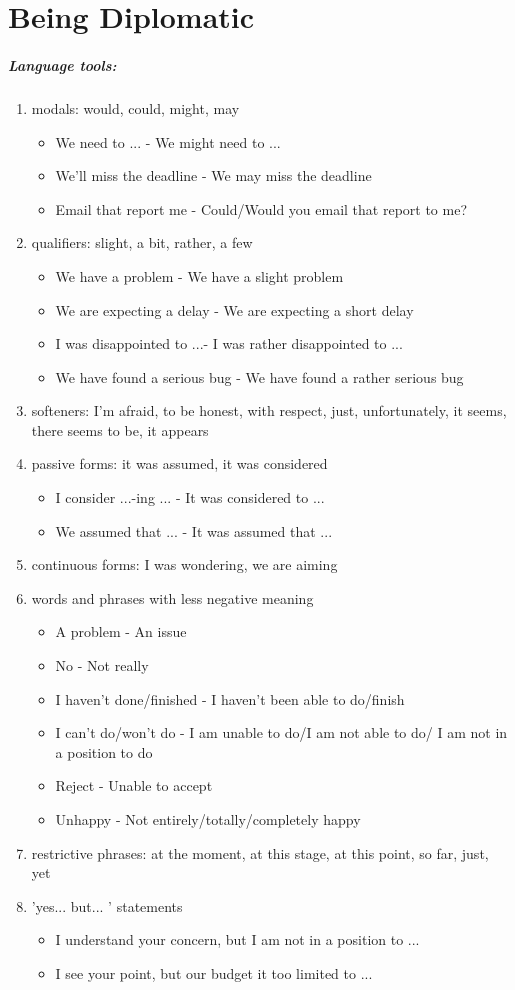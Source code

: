 \section{Being Diplomatic}

\subparagraph{Language tools:}
\begin{enumerate}
\item modals: would, could, might, may
	\begin{itemize}
	\item We need to ... - We might need to ...
	\item We'll miss the deadline - We may miss the deadline
	\item Email that report me - Could/Would you email that report to me?
	\end{itemize}
\item qualifiers: slight, a bit, rather, a few
	\begin{itemize}
	\item We have a problem - We have a slight problem
	\item We are expecting a delay - We are expecting a short delay
	\item I was disappointed to ...- I was rather disappointed to ...
	\item We have found a serious bug - We have found a rather serious bug
	\end{itemize}
\item softeners: I'm afraid, to be honest, with respect, just, unfortunately, it seems, there seems to be, it appears
\item passive forms: it was assumed, it was considered
	\begin{itemize}
	\item I consider ...-ing ... - It was considered to ...
	\item We assumed that ... - It was assumed that ...
	\end{itemize}
\item continuous forms: I was wondering, we are aiming
\item words and phrases with less negative meaning
	\begin{itemize}
	\item A problem - An issue
	\item No - Not really
	\item I haven't done/finished - I haven't been able to do/finish
	\item I can't do/won't do - I am unable to do/I am not able to do/ I am not in a position to do
	\item Reject - Unable to accept
	\item Unhappy - Not entirely/totally/completely happy
	\end{itemize}
\item restrictive phrases: at the moment, at this stage, at this point, so far, just, yet
\item 'yes... but... ' statements
	\begin{itemize}
	\item I understand your concern, but I am not in a position to ...
	\item I see your point, but our budget it too limited to ...
	\end{itemize}
\end{enumerate}